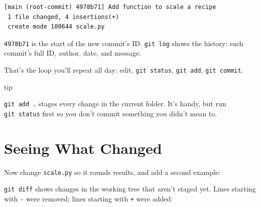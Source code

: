 \begin{codeblock}
\begin{Verbatim}[formatcom=\outputstyle]
[main (root-commit) 4978b71] Add function to scale a recipe
 1 file changed, 4 insertions(+)
 create mode 100644 scale.py
\end{Verbatim}
\end{codeblock}

\texttt{4978b71} is the start of the new commit's ID. \texttt{git\ log} shows the history: each commit's full ID, author, date, and message.

That's the loop you'll repeat all day: edit, \texttt{git\ status}, \texttt{git\ add}, \texttt{git\ commit}.

\begin{callout}{tip}

\texttt{git\ add\ .} stages every change in the current folder. It's handy, but run \texttt{git\ status} first so you don't commit something you didn't mean to.

\end{callout}


\section{Seeing What Changed}\label{08-git-every-day:seeing-what-changed}

Now change \texttt{scale.py} so it rounds results, and add a second example:

\begin{codeblock}

\begin{Shaded}
\begin{Highlighting}[]
     \OperatorTok{*}\NormalTok{)}

\NormalTok{, }\NormalTok{))}
\NormalTok{, }\NormalTok{))}
\end{Highlighting}
\end{Shaded}

\end{codeblock}


\texttt{git\ diff} shows changes in the working tree that aren't staged yet. Lines starting with \texttt{-} were removed; lines starting with \texttt{+} were added:

